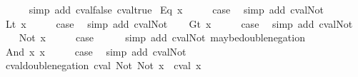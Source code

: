 \begin{isabellebody}
\ \ \ \ \isamarkupfalse%
\ {\isacharparenleft}simp\ add{\isacharcolon}\ cval{\isacharunderscore}false\ cval{\isacharunderscore}true{\isacharparenright}\isanewline
{}\isamarkupfalse%
\isanewline
{}\isamarkupfalse%
\ {\isacharparenleft}Eq\ x{\isacharparenright}\isanewline
\ \ \isamarkupfalse%
\ \isamarkupfalse%
\ {\isacharquery}case\ \isamarkupfalse%
\ {\isacharparenleft}simp\ add{\isacharcolon}\ cval{\isacharunderscore}Not{\isacharparenright}\isanewline
{}\isamarkupfalse%
\isanewline
\ \ \isamarkupfalse%
\ {\isacharparenleft}Lt\ x{\isacharparenright}\isanewline
\ \ \isamarkupfalse%
\ \isamarkupfalse%
\ {\isacharquery}case\ \isamarkupfalse%
\ {\isacharparenleft}simp\ add{\isacharcolon}\ cval{\isacharunderscore}Not{\isacharparenright}\isanewline
{}\isamarkupfalse%
\isanewline
\ \ \isamarkupfalse%
\ {\isacharparenleft}Gt\ x{\isacharparenright}\isanewline
\ \ \isamarkupfalse%
\ \isamarkupfalse%
\ {\isacharquery}case\ \isamarkupfalse%
\ {\isacharparenleft}simp\ add{\isacharcolon}\ cval{\isacharunderscore}Not{\isacharparenright}\isanewline
{}\isamarkupfalse%
\isanewline
\ \ \isamarkupfalse%
\ {\isacharparenleft}Not\ x{\isacharparenright}\isanewline
\ \ \isamarkupfalse%
\ \isamarkupfalse%
\ {\isacharquery}case\isanewline
\ \ \ \ \isamarkupfalse%
\ {\isacharparenleft}simp\ add{\isacharcolon}\ cval{\isacharunderscore}Not\ maybe{\isacharunderscore}double{\isacharunderscore}negation{\isacharparenright}\isanewline
{}\isamarkupfalse%
\isanewline
\ \ \isamarkupfalse%
\ {\isacharparenleft}And\ x{}\ x{}{\isacharparenright}\isanewline
\ \ \isamarkupfalse%
\ \isamarkupfalse%
\ {\isacharquery}case\ \isamarkupfalse%
\ {\isacharparenleft}simp\ add{\isacharcolon}\ cval{\isacharunderscore}Not{\isacharparenright}\isanewline
{}\isamarkupfalse%
%
\endisatagproof
{\isafoldproof}%
%
\isadelimproof
\isanewline
%
\endisadelimproof
\isanewline
{}\isamarkupfalse%
\ cval{\isacharunderscore}double{\isacharunderscore}negation{\isacharcolon}\ {\isachardoublequoteopen}cval\ {\isacharparenleft}Not\ {\isacharparenleft}Not\ x{\isacharparenright}{\isacharparenright}\ {\isacharequal}\ cval\ x{\isachardoublequoteclose}\isanewline
%
\isadelimproof

\end{isabellebody}
